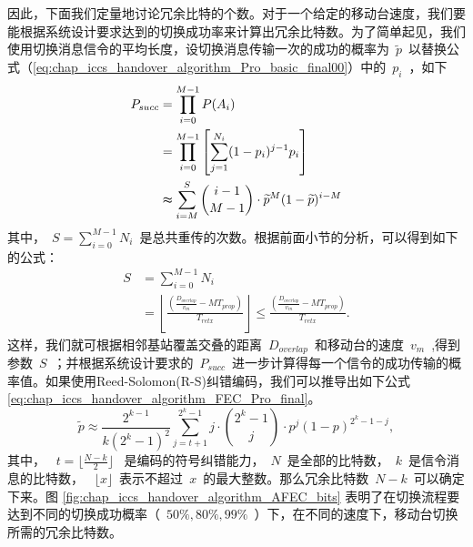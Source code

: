 因此，下面我们定量地讨论冗余比特的个数。对于一个给定的移动台速度，我们要能根据系统设计要求达到的切换成功率来计算出冗余比特数。为了简单起见，我们使用切换消息信令的平均长度，设切换消息传输一次的成功的概率为~$\tilde{p}$~以替换公式（\ref{eq:chap_iccs_handover_algorithm_Pro_basic_final00}）中的~$p_i$~，如下
\begin{align}
\notag P_{succ} &= \prod_{i=0}^{M-1}P(A_{i})\\
&= \prod_{i=0}^{M-1}\left[\sum_{j=1}^{N_{i}}(1-p_{i})^{j-1}p_{i}\right]\\
\notag &\thickapprox\sum_{i=M}^{S}{i-1 \choose M-1}\cdot\widetilde{p}^{M}(1-\widetilde{p})^{i-M}
\end{align}
其中，~$S=\sum_{i=0}^{M-1}N_{i}$~是总共重传的次数。根据前面小节的分析，可以得到如下的公式：
\begin{align*}
S & = \sum_{i=0}^{M-1}N_{i}\\
  & = \left\lfloor \frac{(\frac{D_{overlap}}{v_{m}}-MT_{prop})}
        {T_{retx}}\right\rfloor \leq\frac{(\frac{D_{overlap}}{v_{m}}
        -MT_{prop})}{T_{retx}}.
\end{align*}
这样，我们就可根据相邻基站覆盖交叠的距离~$D_{overlap}$~和移动台的速度~$v_m$~,得到参数~$S$~；并根据系统设计要求的~$P_{succ}$~进一步计算得每一个信令的成功传输的概率值。如果使用Reed-Solomon(R-S)纠错编码，我们可以推导出如下公式\eqref{eq:chap_iccs_handover_algorithm_FEC_Pro_final}。
\begin{equation}\label{eq:chap_iccs_handover_algorithm_FEC_Pro_final}
\tilde{p}\approx\frac{2^{k-1}}{k(2^{k}-1)^{2}}\sum_{j=t+1}^{2^{k}-1}j
\cdot{2^{k}-1\choose j}_{}^{}\cdot p^{j}(1-p)^{2^{k}-1-j},
\end{equation}
其中， ~$t=\lfloor\frac{N-k}{2}\rfloor$~ 是编码的符号纠错能力，~$N$~是全部的比特数，~$k$~是信令消息的比特数， ~$\lfloor{x}\rfloor$~表示不超过~$x$~的最大整数。那么冗余比特数~$N-k$~可以确定下来。图 \ref{fig:chap_iccs_handover_algorithm_AFEC_bits} 表明了在切换流程要达到不同的切换成功概率（~$50\%,80\%,99\%$~）下，在不同的速度下，移动台切换所需的冗余比特数。
